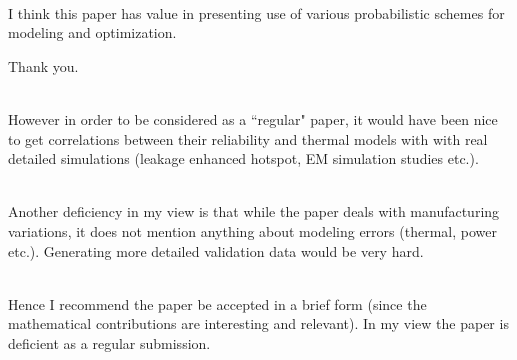 \begin{reviewer}
\\
I think this paper has value in presenting use of various probabilistic schemes
for modeling and optimization.
\end{reviewer}

\begin{authors}
  Thank you.
\end{authors}

\begin{reviewer}
\\
However in order to be considered as a ``regular" paper, it would have been
nice to get correlations between their reliability and thermal models with with
real detailed simulations (leakage enhanced hotspot, EM simulation studies
etc.).
\end{reviewer}

\begin{authors}
\begin{actions}
\end{actions}
\end{authors}

\begin{reviewer}
\\
Another deficiency in my view is that while the paper deals with
manufacturing variations, it does not mention anything about modeling errors
(thermal, power etc.). Generating more detailed validation data would be very
hard.
\end{reviewer}

\begin{authors}
\begin{actions}
\end{actions}
\end{authors}

\begin{reviewer}
\\
Hence I recommend the paper be accepted in a brief form (since the
mathematical contributions are interesting and relevant). In my view the paper
is deficient as a regular submission.
\end{reviewer}

\begin{authors}
\begin{actions}
\end{actions}
\end{authors}
